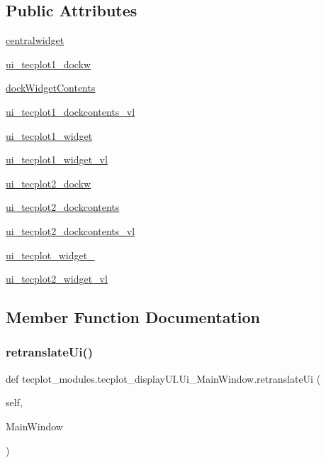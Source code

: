 \subsection*{Public Attributes}
\begin{DoxyCompactItemize}
\item 
\hyperlink{a00114_a8806355d8f5b1e79e73c21d82b2a02b1}{centralwidget}
\item 
\hyperlink{a00114_a5bc16af243ddcb715ac4dca3eaeea83f}{ui\+\_\+tecplot1\+\_\+dockw}
\item 
\hyperlink{a00114_a5f2617d5cf96b7f5c5eab71716630e9f}{dock\+Widget\+Contents}
\item 
\hyperlink{a00114_a669ef5be286de5a4683863273aea2117}{ui\+\_\+tecplot1\+\_\+dockcontents\+\_\+vl}
\item 
\hyperlink{a00114_a0e12cc099f3392ddc5763b2e11735c65}{ui\+\_\+tecplot1\+\_\+widget}
\item 
\hyperlink{a00114_a29ec621d9a4d64b9ac2741603bfd4c0b}{ui\+\_\+tecplot1\+\_\+widget\+\_\+vl}
\item 
\hyperlink{a00114_a39ab796d26cd8af1d7b08a1af13f18d3}{ui\+\_\+tecplot2\+\_\+dockw}
\item 
\hyperlink{a00114_afcc75b6eb098b33d244b16c759c2b0fd}{ui\+\_\+tecplot2\+\_\+dockcontents}
\item 
\hyperlink{a00114_a8883278a682ade2e54c270ba2064a3d8}{ui\+\_\+tecplot2\+\_\+dockcontents\+\_\+vl}
\item 
\hyperlink{a00114_adf880d85360d7fc4761f74c7ab80e09f}{ui\+\_\+tecplot\+\_\+widget\+\_}
\item 
\hyperlink{a00114_a3b0bcb24fdafc82b684e59b018c76ba9}{ui\+\_\+tecplot2\+\_\+widget\+\_\+vl}
\end{DoxyCompactItemize}


\subsection{Member Function Documentation}
\hypertarget{a00114_ae1811975426f7bbfcbe9bd6ae8a4d444}{}\label{a00114_ae1811975426f7bbfcbe9bd6ae8a4d444} 
\subsubsection{\texorpdfstring{retranslate\+Ui()}{retranslateUi()}}
{\footnotesize\ttfamily def tecplot\+\_\+modules.\+tecplot\+\_\+display\+U\+I.\+Ui\+\_\+\+Main\+Window.\+retranslate\+Ui (\begin{DoxyParamCaption}\item[{}]{self,  }\item[{}]{Main\+Window }\end{DoxyParamCaption})}

